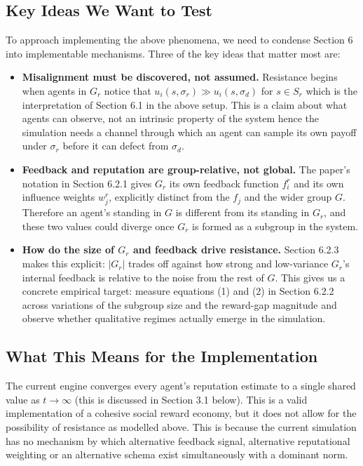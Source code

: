 \documentclass[12pt]{article}
\begin{document}
\subsection{Key Ideas We Want to Test}
To approach implementing the above phenomena, we need to condense Section 6 into implementable mechanisms.
Three of the key ideas that matter most are:
\begin{itemize}
    \item \textbf{Misalignment must be discovered, not assumed.} Resistance begins when agents in $G_r$
    notice that $u_i(s, \sigma_r) \gg u_i(s, \sigma_d)$ for $s \in S_r$ which is the interpretation of Section 6.1 in the above setup.
    This is a claim about what agents can observe, not an intrinsic property of the system hence the simulation needs a channel
    through which an agent can sample its own payoff under $\sigma_r$ before it can defect from $\sigma_d$.
    \item \textbf{Feedback and reputation are group-relative, not global.} The paper's notation in Section 6.2.1
    gives $G_r$ its own feedback function $f^r_i$ and its own influence weights $w_j^r$, explicitly distinct
    from the $f_j$ and the wider group $G$. Therefore an agent's standing in $G$ is different from its standing in $G_r$,
    and these two values could diverge once $G_r$ is formed as a subgroup in the system.
    \item \textbf{How do the size of $G_r$ and feedback drive resistance.} Section 6.2.3
    makes this explicit: $|G_r|$ trades off against how strong and low-variance $G_r$'s internal feedback
    is relative to the noise from the rest of $G$. This gives us a concrete empirical target:
    measure equations (1) and (2) in Section 6.2.2 across variations of the subgroup size and the reward-gap
    magnitude and observe whether qualitative regimes actually emerge in the simulation.
\end{itemize}

\subsection{What This Means for the Implementation}
The current engine converges every agent's reputation estimate to a single shared value as $t \to \infty$
(this is discussed in Section 3.1 below). This is a valid implementation of a cohesive social reward economy,
but it does not allow for the possibility of resistance as modelled above. This is because
the current simulation has no mechanism by which alternative feedback signal, alternative reputational weighting or an alternative
schema exist simultaneously with a dominant norm.
\end{document}

